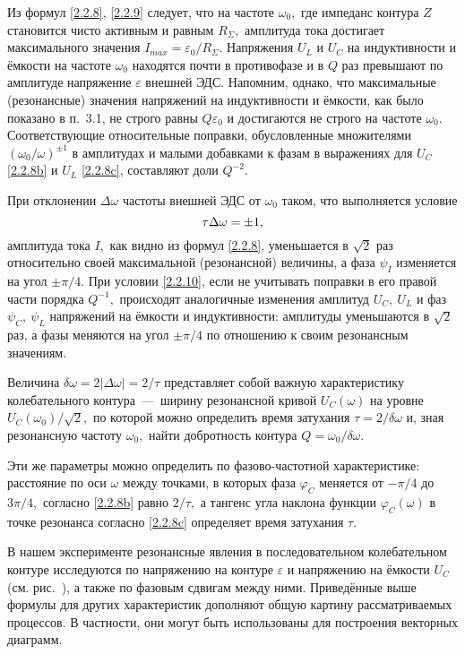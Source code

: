 Из формул \eqref{2.2.8}, \eqref{2.2.9} следует, что на частоте $\omega_0,$ где
импеданс контура $Z$ становится чисто активным и равным $R_{\Sigma},$ амплитуда
тока достигает максимального значения $I_{max}=\varepsilon_0/R_{\Sigma}.$
Напряжения $U_L$ и $U_C$ на индуктивности и ёмкости на частоте $\omega_0$
находятся почти в противофазе и в $Q$ раз превышают по амплитуде напряжение
$\varepsilon$ внешней ЭДС. Напомним, однако, что максимальные (резонансные)
значения напряжений на индуктивности и ёмкости, как было показано в п.~3.1, не
строго равны $Q\varepsilon_0$ и достигаются не строго на частоте $\omega_0.$
Соответствующие относительные поправки, обусловленные множителями
$(\omega_0/\omega)^{\pm1}$ в амплитудах и малыми добавками к фазам в выражениях
для $U_C$ \eqref{2.2.8b} и $U_L$ \eqref{2.2.8c}, составляют доли $Q^{-2}.$

При отклонении $\Delta\omega$ частоты внешней ЭДС от $\omega_0$ таком, что
выполняется условие
\begin{equation}\eqmark{2.2.10}
\tau\Delta\omega=\pm1,
\end{equation}
амплитуда тока $I,$ как видно из формул \eqref{2.2.8}, уменьшается в $\sqrt{2}$
раз относительно своей максимальной (резонансной) величины, а фаза $\psi_I$
изменяется на угол $\pm\pi/4.$ При условии \eqref{2.2.10}, если не учитывать
поправки в его правой части порядка $Q^{-1},$ происходят аналогичные изменения
амплитуд $U_C,~U_L $ и фаз $\psi_C,~\psi_L$ напряжений на ёмкости и
индуктивности: амплитуды уменьшаются в $\sqrt{2}$ раз, а фазы меняются на угол
$\pm\pi/4$ по отношению к своим резонансным значениям.

Величина $\delta\omega=2|\Delta\omega|=2/\tau$ представляет собой важную
характеристику колебательного контура~---~ширину резонансной кривой
$U_C(\omega)$ на уровне $U_C(\omega_0)/\sqrt{2},$ по которой можно определить
время затухания $\tau=2/\delta\omega$ и, зная резонансную частоту $\omega_0,$
найти добротность контура $Q=\omega_0/\delta\omega.$

Эти же параметры можно определить по фазово-частотной характеристике: расстояние
по оси $\omega$ между точками, в которых фаза $\varphi_C$ меняется от $-\pi/4$
до $3\pi/4,$ согласно \eqref{2.2.8b} равно $2/\tau,$ а тангенс угла наклона
функции $\varphi_C(\omega)$ в точке резонанса согласно \eqref{2.2.8c} определяет
время затухания $\tau.$

В нашем эксперименте резонансные явления в последовательном колебательном
контуре исследуются по напряжению на контуре $\varepsilon$ и напряжению на
ёмкости $U_C$ (см. рис.~), а также по фазовым сдвигам между ними.
Приведённые выше формулы для других характеристик дополняют общую картину
рассматриваемых процессов. В частности, они могут быть использованы для
построения векторных диаграмм.

